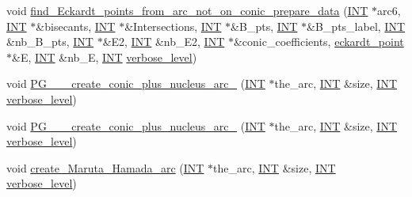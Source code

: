 \begin{DoxyCompactItemize}
\item 
void \mbox{\hyperlink{classprojective__space_a0fc1d9c2df818d2ffa6750c2cb63c54c}{find\+\_\+\+Eckardt\+\_\+points\+\_\+from\+\_\+arc\+\_\+not\+\_\+on\+\_\+conic\+\_\+prepare\+\_\+data}} (\mbox{\hyperlink{galois_8h_a09fddde158a3a20bd2dcadb609de11dc}{I\+NT}} $\ast$arc6, \mbox{\hyperlink{galois_8h_a09fddde158a3a20bd2dcadb609de11dc}{I\+NT}} $\ast$\&bisecants, \mbox{\hyperlink{galois_8h_a09fddde158a3a20bd2dcadb609de11dc}{I\+NT}} $\ast$\&Intersections, \mbox{\hyperlink{galois_8h_a09fddde158a3a20bd2dcadb609de11dc}{I\+NT}} $\ast$\&B\+\_\+pts, \mbox{\hyperlink{galois_8h_a09fddde158a3a20bd2dcadb609de11dc}{I\+NT}} $\ast$\&B\+\_\+pts\+\_\+label, \mbox{\hyperlink{galois_8h_a09fddde158a3a20bd2dcadb609de11dc}{I\+NT}} \&nb\+\_\+\+B\+\_\+pts, \mbox{\hyperlink{galois_8h_a09fddde158a3a20bd2dcadb609de11dc}{I\+NT}} $\ast$\&E2, \mbox{\hyperlink{galois_8h_a09fddde158a3a20bd2dcadb609de11dc}{I\+NT}} \&nb\+\_\+\+E2, \mbox{\hyperlink{galois_8h_a09fddde158a3a20bd2dcadb609de11dc}{I\+NT}} $\ast$\&conic\+\_\+coefficients, \mbox{\hyperlink{classeckardt__point}{eckardt\+\_\+point}} $\ast$\&E, \mbox{\hyperlink{galois_8h_a09fddde158a3a20bd2dcadb609de11dc}{I\+NT}} \&nb\+\_\+E, \mbox{\hyperlink{galois_8h_a09fddde158a3a20bd2dcadb609de11dc}{I\+NT}} \mbox{\hyperlink{simeon_8_c_a818073fbcc2f439e7c56952f67386122}{verbose\+\_\+level}})
\item 
void \mbox{\hyperlink{classprojective__space_a9132a544b2bc603f886f9cf358346cf6}{P\+G\+\_\+\_\+\_\+create\+\_\+conic\+\_\+plus\+\_\+nucleus\+\_\+arc\+\_}} (\mbox{\hyperlink{galois_8h_a09fddde158a3a20bd2dcadb609de11dc}{I\+NT}} $\ast$the\+\_\+arc, \mbox{\hyperlink{galois_8h_a09fddde158a3a20bd2dcadb609de11dc}{I\+NT}} \&size, \mbox{\hyperlink{galois_8h_a09fddde158a3a20bd2dcadb609de11dc}{I\+NT}} \mbox{\hyperlink{simeon_8_c_a818073fbcc2f439e7c56952f67386122}{verbose\+\_\+level}})
\item 
void \mbox{\hyperlink{classprojective__space_ac62af97d3b119c3ba8a619d08b2f1e0f}{P\+G\+\_\+\_\+\_\+create\+\_\+conic\+\_\+plus\+\_\+nucleus\+\_\+arc\+\_}} (\mbox{\hyperlink{galois_8h_a09fddde158a3a20bd2dcadb609de11dc}{I\+NT}} $\ast$the\+\_\+arc, \mbox{\hyperlink{galois_8h_a09fddde158a3a20bd2dcadb609de11dc}{I\+NT}} \&size, \mbox{\hyperlink{galois_8h_a09fddde158a3a20bd2dcadb609de11dc}{I\+NT}} \mbox{\hyperlink{simeon_8_c_a818073fbcc2f439e7c56952f67386122}{verbose\+\_\+level}})
\item 
void \mbox{\hyperlink{classprojective__space_a0139fefceb87bdff7eca4947f6ded89b}{create\+\_\+\+Maruta\+\_\+\+Hamada\+\_\+arc}} (\mbox{\hyperlink{galois_8h_a09fddde158a3a20bd2dcadb609de11dc}{I\+NT}} $\ast$the\+\_\+arc, \mbox{\hyperlink{galois_8h_a09fddde158a3a20bd2dcadb609de11dc}{I\+NT}} \&size, \mbox{\hyperlink{galois_8h_a09fddde158a3a20bd2dcadb609de11dc}{I\+NT}} \mbox{\hyperlink{simeon_8_c_a818073fbcc2f439e7c56952f67386122}{verbose\+\_\+level}})

\end{DoxyCompactItemize}
